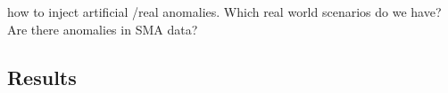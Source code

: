 %
%
%
%
%
%
%
%
how to inject artificial \cite{darban_carla_2024} /real anomalies. Which real world scenarios do we have? Are there anomalies in SMA data?
\subsection{Results}
